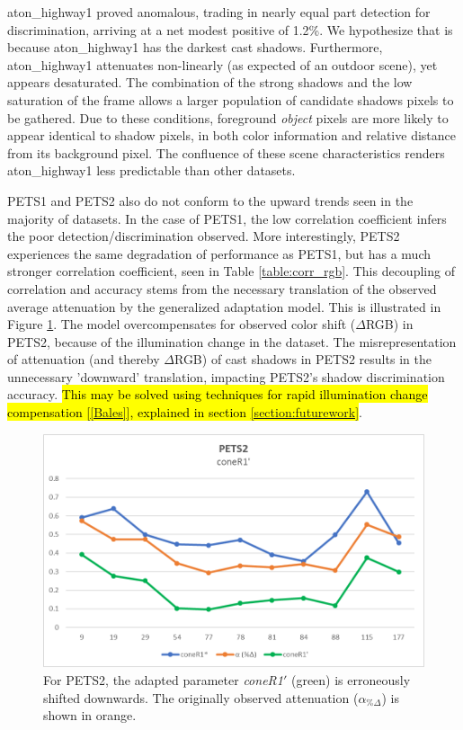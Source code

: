 aton\_highway1 proved anomalous, trading in nearly equal part detection for discrimination, arriving at a net modest positive of 1.2\%. We hypothesize that is because aton\_highway1 has the darkest cast shadows. Furthermore, aton\_highway1 attenuates non-linearly (as expected of an outdoor scene), yet appears desaturated. The combination of the strong shadows and the low saturation of the frame allows a larger population of candidate shadows pixels to be gathered. Due to these conditions, foreground \textit{object} pixels are more likely to appear identical to shadow pixels, in both color information and relative distance from its background pixel. The confluence of these scene characteristics renders aton\_highway1 less predictable than other datasets.

PETS1 and PETS2 also do not conform to the upward trends seen in the majority of datasets. In the case of PETS1, the low correlation coefficient infers the poor detection/discrimination observed. More interestingly, PETS2 experiences the same degradation of performance as PETS1, but has a much stronger correlation coefficient, seen in Table \ref{table:corr_rgb}. This decoupling of correlation and accuracy stems from the necessary translation of the observed average attenuation by the generalized adaptation model. This is illustrated in Figure \ref{fig:pets2_translate}. The model overcompensates for observed color shift ($\Delta$RGB) in PETS2, because of the illumination change in the dataset. The misrepresentation of attenuation (and thereby $\Delta$RGB) of cast shadows in PETS2 results in the unnecessary 'downward' translation, impacting PETS2's shadow discrimination accuracy. \hl{This may be solved using techniques for rapid illumination change compensation [\ref{Bales}], explained in section \ref{section:futurework}}.

\begin{figure}
  \centering
  \includegraphics[width=.8\linewidth]{figures/model/pets2_translate.jpg}
\caption{For PETS2, the adapted parameter \textit{coneR1}$'$ (green) is erroneously shifted downwards. The originally observed attenuation ($\alpha_{\%\Delta}$) is shown in orange.}
\label{fig:pets2_translate}
\end{figure} 

